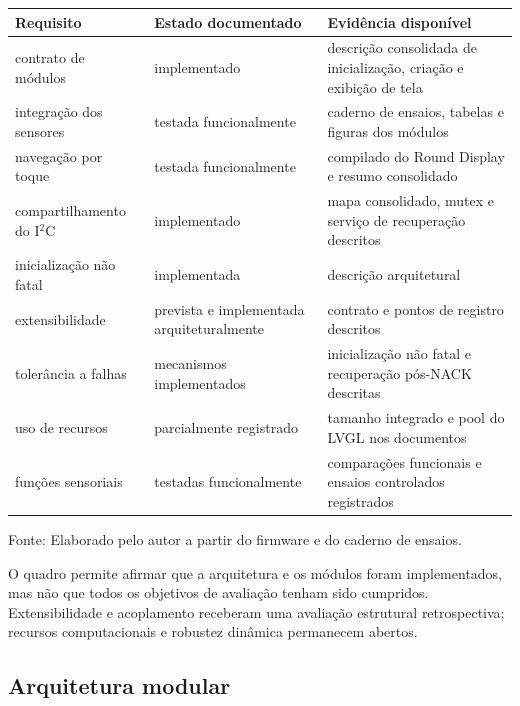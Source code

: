 \documentclass[a4paper,12pt]{article}
\newcommand{\fonteelemento}[1]{%
  \par\smallskip
  {\footnotesize\raggedright Fonte: #1.\par}%
}
\begin{document}
\begin{quadro}[H]
\centering
\caption{Estado dos requisitos da plataforma}
\label{qua:estado-requisitos}
\small
\begin{tabularx}{\textwidth}{|>{\raggedright\arraybackslash}p{}|>{\raggedright\arraybackslash}p{}|>{\raggedright\arraybackslash}X|}
\hline
\textbf{Requisito} & \textbf{Estado documentado} & \textbf{Evid\^encia dispon\'ivel} \\
\hline
contrato de m\'odulos & implementado & descri\c{c}\~ao consolidada de inicializa\c{c}\~ao, cria\c{c}\~ao e exibi\c{c}\~ao de tela \\
\hline
integra\c{c}\~ao dos sensores & testada funcionalmente & caderno de ensaios, tabelas e figuras dos m\'odulos \\
\hline
navega\c{c}\~ao por toque & testada funcionalmente & compilado do Round Display e resumo consolidado \\
\hline
compartilhamento do I$^2$C & implementado & mapa consolidado, mutex e servi\c{c}o de recupera\c{c}\~ao descritos \\
\hline
inicializa\c{c}\~ao n\~ao fatal & implementada & descri\c{c}\~ao arquitetural \\
\hline
extensibilidade & prevista e implementada arquiteturalmente & contrato e pontos de registro descritos \\
\hline
toler\^ancia a falhas & mecanismos implementados & inicializa\c{c}\~ao n\~ao fatal e recupera\c{c}\~ao p\'os-NACK descritas \\
\hline
uso de recursos & parcialmente registrado & tamanho integrado e pool do LVGL nos documentos \\
\hline
fun\c{c}\~oes sensoriais & testadas funcionalmente & compara\c{c}\~oes funcionais e ensaios controlados registrados \\
\hline
\end{tabularx}
\fonteelemento{Elaborado pelo autor a partir do firmware e do caderno de ensaios}
\end{quadro}


O quadro permite afirmar que a arquitetura e os m\'odulos foram implementados, mas n\~ao que todos os objetivos de avalia\c{c}\~ao tenham sido cumpridos. Extensibilidade e acoplamento receberam uma avalia\c{c}\~ao estrutural retrospectiva; recursos computacionais e robustez din\^amica permanecem abertos.


\subsection{Arquitetura modular}
\end{document}
